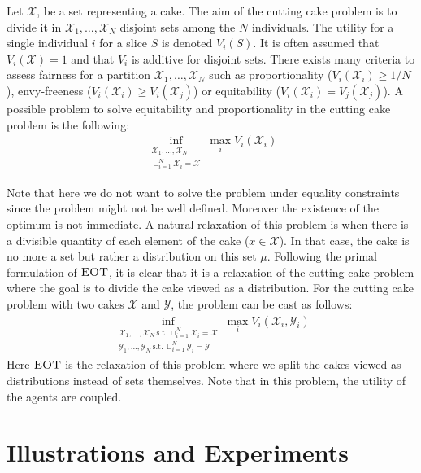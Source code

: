 Let $\mathcal{X}$, be a set representing a cake. The aim of the cutting cake problem is to divide it in $\mathcal{X}_1,\dots,\mathcal{X}_N$ disjoint sets among the $N$ individuals. The utility for a single individual $i$ for a slice $S$ is denoted $V_i(S)$. It is often assumed that $V_i(\mathcal{X}) = 1$ and that $V_i$ is additive for disjoint sets. There exists many criteria to assess fairness for a partition $\mathcal{X}_1,\dots,\mathcal{X}_N$ such as proportionality ($V_i(\mathcal{X}_i)\geq 1/N$), envy-freeness ($V_i(\mathcal{X}_i)\geq V_i(\mathcal{X}_j)$) or equitability ($V_i(\mathcal{X}_i)= V_j(\mathcal{X}_j)$). A possible problem to solve equitability and proportionality in the cutting cake problem is the following:
\begin{align}
    \inf_{\substack{\mathcal{X}_1,...,\mathcal{X}_N\\  \sqcup_{i=1}^N\mathcal{X}_i=\mathcal{X}}}\max_i V_i(\mathcal{X}_i)
\end{align}

Note that here we do not want to solve the problem under equality constraints since the problem might not be well defined. Moreover the existence of the optimum is not immediate. A natural relaxation of this problem is when there is a divisible quantity of each element of the cake ($x\in\mathcal{X}$). In that case, the cake is no more a set but rather a distribution on this set $\mu$. Following the primal formulation of $\textsc{EOT}$, it is clear that it is a relaxation of the cutting cake problem where the goal is to divide the cake viewed as a distribution. For the cutting cake problem with two cakes $\mathcal{X}$ and $\mathcal{Y}$, the problem can be cast as follows:
\begin{align}
    \inf_{\substack{\mathcal{X}_1,...,\mathcal{X}_N~\text{s.t.}~\sqcup_{i=1}^N\mathcal{X}_i=\mathcal{X}\\\mathcal{Y}_1,...,\mathcal{Y}_N~\text{s.t.}~\sqcup_{i=1}^N\mathcal{Y}_i=\mathcal{Y}}}\max_i  V_i(\mathcal{X}_i,\mathcal{Y}_i)
\end{align}
Here $\textsc{EOT}$ is the relaxation of this problem where we split the cakes viewed as distributions instead of sets themselves. Note that in this problem, the utility of the agents are coupled.
\newpage

\section{Illustrations and Experiments}
\label{appendix-illustrations}

